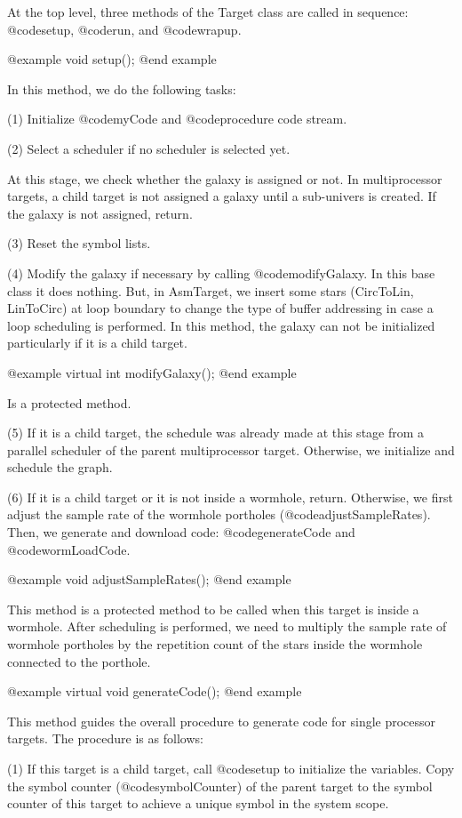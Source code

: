 At the top level, three methods of the Target class are called in sequence:
@code{setup}, @code{run}, and @code{wrapup}. 

@example
void setup();
@end example

In this method, we do the following tasks:

(1) Initialize @code{myCode} and @code{procedure} code stream.

(2) Select a scheduler if no scheduler is selected yet.

At this stage, we check whether the galaxy is assigned or not. In
multiprocessor targets, a child target is not assigned a galaxy until
a sub-univers is created. If the galaxy is not assigned, return.

(3) Reset the symbol lists.

(4) Modify the galaxy if necessary by calling @code{modifyGalaxy}. In this
base class it does nothing. But, in AsmTarget, we insert some stars
(CircToLin, LinToCirc) at loop boundary to change the type of buffer
addressing in case a loop scheduling is performed. In this method,
the galaxy can not be initialized particularly if it is a child target.

@example
virtual int modifyGalaxy();
@end example

Is a protected method.

(5) If it is a child target, the schedule was already made at this stage
from a parallel scheduler of the parent multiprocessor target. Otherwise,
we initialize and schedule the graph.

(6) If it is a child target or it is not inside a wormhole, return.
Otherwise, we first adjust the sample rate of the wormhole portholes
(@code{adjustSampleRates}). Then, we generate and download code:
@code{generateCode} and @code{wormLoadCode}.

@example
void adjustSampleRates();
@end example

This method is a protected method to be called when this target is
inside a wormhole. After scheduling is performed, we need to multiply
the sample rate of wormhole portholes by the repetition
count of the stars inside the wormhole connected to the porthole.

@example
virtual void generateCode();
@end example

This method guides the overall procedure to generate code for single
processor targets. The procedure is as follows:

(1) If this target is a child target, call @code{setup} to initialize the
variables. Copy the symbol counter (@code{symbolCounter}) of the parent
target to the symbol counter of this target to achieve a unique symbol
in the system scope.

